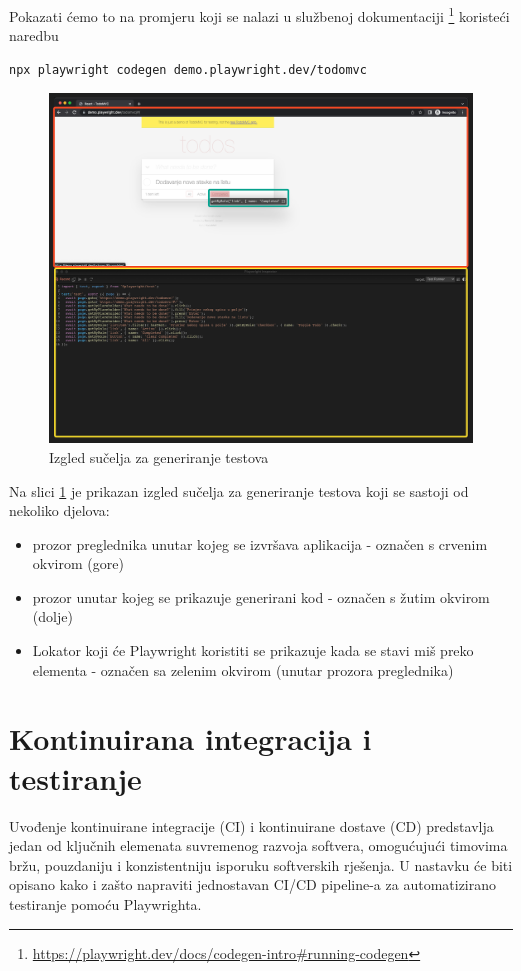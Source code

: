 Pokazati ćemo to na promjeru koji se nalazi u službenoj dokumentaciji \footnote{\url{https://playwright.dev/docs/codegen-intro\#running-codegen}} koristeći naredbu
\begin{verbatim}
npx playwright codegen demo.playwright.dev/todomvc
\end{verbatim}
\begin{figure}[!h]\begin{center}
    \includegraphics[width=1\textwidth]{"img/codegenInterface"}
    \caption{Izgled sučelja za generiranje testova}\label{img:pwCodeGen}
\end{center}\end{figure}

Na slici \ref{img:pwCodeGen} je prikazan izgled sučelja za generiranje testova koji se sastoji od nekoliko djelova:
\begin{itemize}
    \item prozor preglednika unutar kojeg se izvršava aplikacija - označen s crvenim okvirom (gore)
    \item prozor unutar kojeg se prikazuje generirani kod - označen s žutim okvirom (dolje)
    \item Lokator koji će Playwright koristiti se prikazuje kada se stavi miš preko elementa - označen sa zelenim okvirom (unutar prozora preglednika)
\end{itemize}


\section{Kontinuirana integracija i testiranje}\label{CI/CD}
Uvođenje kontinuirane integracije (CI) i kontinuirane dostave (CD) predstavlja jedan od ključnih elemenata suvremenog razvoja softvera, omogućujući timovima bržu, pouzdaniju i konzistentniju isporuku softverskih rješenja. 
U nastavku će biti opisano kako i zašto napraviti jednostavan CI/CD pipeline-a za automatizirano testiranje pomoću Playwrighta.

